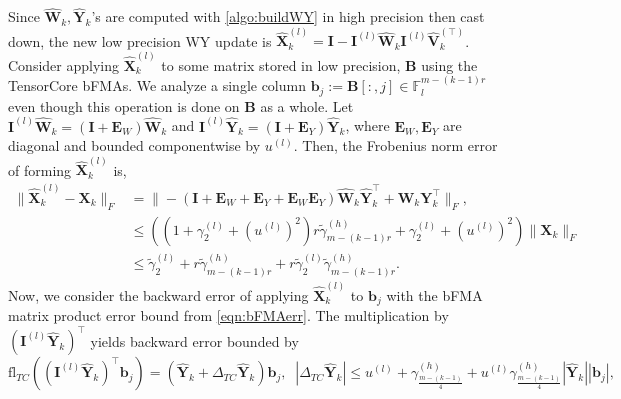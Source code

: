 \documentclass[review,onefignum,onetabnum]{siamart190516}
\newcommand{\F}{\mathbb{F}}
\newcommand{\bb}[1]{\mathbf{#1}}
\newcommand{\fl}{\mathrm{fl}}
\begin{document}
Since $\hat{\bb{W}}_{k},\hat{\bb{Y}}_k$'s are computed with \cref{algo:buildWY} in high precision then cast down, the new low precision WY update is $\hat{\bb{X}}_{k}^{(l)} = \bb{I}-\bb{I}^{(l)}\hat{\bb{W}}_k\bb{I}^{(l)}\hat{\bb{V}}_k^{(\top)}$.
Consider applying $\hat{\bb{X}}_k^{(l)}$ to some matrix stored in low precision, $\bb{B}$ using the TensorCore bFMAs.
We analyze a single column $\bb{b}_j:=\bb{B}[:,j] \in \F_l^{m-(k-1)r}$ even though this operation is done on $\bb{B}$ as a whole.
Let $\bb{I}^{(l)}\hat{\bb{W}}_k = (\bb{I}+\bb{E}_W)\hat{\bb{W}}_k$ and $\bb{I}^{(l)}\hat{\bb{Y}}_k = (\bb{I}+\bb{E}_Y)\hat{\bb{Y}}_k$, where $\bb{E}_W,\bb{E}_Y$ are diagonal and bounded componentwise by $u^{(l)}$.  
Then, 
the Frobenius norm error of forming $\hat{\bb{X}}_{k}^{(l)}$ is,
\begin{align*}
\|\hat{\bb{X}}_{k}^{(l)}- \bb{X}_{k}\|_F  &= \|-\left(\bb{I}+\bb{E}_W+\bb{E}_Y+ \bb{E}_W\bb{E}_Y\right)\hat{\bb{W}}_k\hat{\bb{Y}}_k^{\top} + \bb{W}_k\bb{Y}_k^{\top}\|_F,\\
&\leq \left((1+\gamma_2^{(l)}+(u^{(l)})^2)r\tilde{\gamma}_{m-(k-1)r}^{(h)}+\gamma_2^{(l)}+(u^{(l)})^2\right)\|\bb{X}_k\|_F\\
&\leq \tilde{\gamma}_2^{(l)} +r\tilde{\gamma}_{m-(k-1)r}^{(h)} + r\tilde{\gamma}_2^{(l)}\tilde{\gamma}_{m-(k-1)r}^{(h)}.
\end{align*}
Now, we consider the backward error of applying $\hat{\bb{X}}_{k}^{(l)}$ to $\bb{b}_j$ with the bFMA matrix product error bound from \cref{eqn:bFMAerr}.
The multiplication by $(\bb{I}^{(l)}\hat{\bb{Y}}_k)^{\top}$ yields backward error bounded by
\begin{equation*}
\fl_{TC}((\bb{I}^{(l)}\hat{\bb{Y}}_k)^{\top}\bb{b}_j) = (\hat{\bb{Y}}_k+\Delta_{TC}\hat{\bb{Y}}_k)\bb{b}_j,\;\;|\Delta_{TC}\hat{\bb{Y}}_k| \leq u^{(l)}+\gamma_{\frac{m-(k-1)}{4}}^{(h)}+u^{(l)}\gamma_{\frac{m-(k-1)}{4}}^{(h)}|\hat{\bb{Y}}_k||\bb{b}_j|,
\end{equation*}
\end{document}
